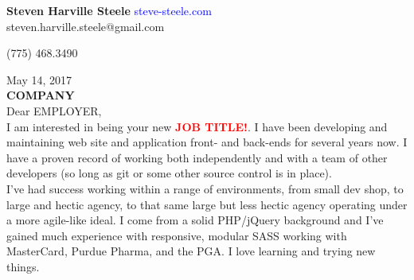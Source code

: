 \documentclass[11pt]{ncsuthesis4}
\begin{document}
\oddsidemargin 0.25in
\evensidemargin 0.25in
\textwidth 6.0in
\topmargin 0.25in
\textheight 8.0in
\renewcommand{\baselinestretch}{2}
\renewcommand{\headrulewidth}{0pt}
\thispagestyle{empty}
\rhead{\thepage}
\setlength{\headsep}{0in}
\setlength{\parindent}{2em}




\noindent \textbf{\Large Steven Harville Steele} \hfill \textcolor{blue}{steve-steele.com}
\\

\hfill steven.harville.steele@gmail.com

\hfill (775) 468.3490

\noindent May 14, 2017\\%

\noindent \textbf{COMPANY}\\%

\noindent Dear EMPLOYER,
\\

\noindent
I am interested in being your new \textcolor{red}{\textbf{JOB TITLE!}}. I have been developing and maintaining web site and application front- and back-ends for several years now. I have a proven record of working both independently and with a team of other developers (so long as git or some other source control is in place).
\\

\noindent
I've had success working within a range of environments, from small dev shop, to large and hectic agency, to that same large but less hectic agency operating under a more agile-like ideal. I come from a solid PHP/jQuery background and I've gained much experience with responsive, modular SASS working with MasterCard, Purdue Pharma, and the PGA. I love learning and trying new things.
\\
\end{document}
